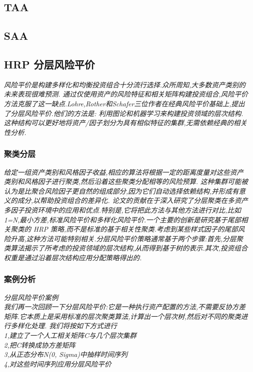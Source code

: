 \documentclass{scrartcl}
\numberwithin{equation}{section}   %
\begin{document}
\subsection{TAA}

\subsection{SAA}

\subsection{HRP 分层风险平价}
\textsl{
    风险平价是构建多样化和均衡投资组合十分流行选择.众所周知,大多数资产类别的未来表现很难预测. 通过仅使用资产的风险特征和相关矩阵构建投资组合,风险平价方法克服了这一缺点.Lohre,Rother和Schafer三位作者在经典风险平价基础上,提出了分层风险平价.他们的方法是:
    利用图论和机器学习来构建投资领域的层次结构.这种结构可以更好地将资产/因子划分为具有相似特征的集群,无需依赖经典的相关性分析.}
\subsubsection{聚类分层}
\textsl{
    给定一组资产类别和风格因子收益,相应的算法将根据一定的距离度量对这些资产类别和风格因子进行聚类,然后沿着这些聚类分配相等的风险预算.  这种集群可能被认为是比聚合风险因子更自然的组成部分,因为它们自动选择依赖结构,并形成有意义的成分,以帮助投资组合的差异化.
    论文的贡献在于深入研究了分层聚类在多资产多因子投资环境中的应用和优点.特别是,它将把此方法与其他方法进行对比,比如1=N,最小方差,标准风险平价和多样化风险平价.一个主要的创新是研究基于尾部相关聚类的 HRP 策略,而不是标准的基于相关性聚类.考虑到某些样式因子的尾部风险升高,这种方法可能特别相关.分层风险平价策略通常基于两个步骤:首先,分层聚类算法揭示了所考虑的投资领域的层次结构,从而得到基于树的表示.其次,投资组合权重是通过沿着层次结构应用分配策略得出的.}

\subsubsection{案例分析}
\textsl{
    分层风险平价案例\\
    我们再一次回顾一下分层风险平价:它是一种执行资产配置的方法,不需要反协方差矩阵.它本质上是采用标准的层次聚类算法,计算出一个层次树,然后对不同的聚类进行多样化处理.
    我们将按如下方式进行
    \\ 1,建立了一个人工相关矩阵C与几个层次集群
    \\ 2,把C转换成协方差矩阵
    \\ 3,从正态分布N(0, Sigma)中抽样时间序列
    \\ 4,对这些时间序列应用分层风险平价}
\end{document}
